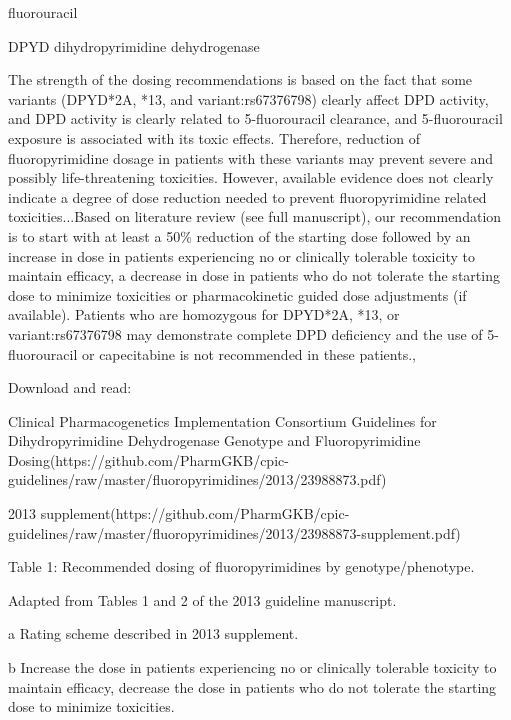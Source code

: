 \documentclass{resume} %
\begin{document}
\begin{rSection}{ fluorouracil }
\begin{rSubsection}{ DPYD }{ dihydropyrimidine dehydrogenase }{}{}
\item The strength of the dosing recommendations is based on the fact that some variants (DPYD*2A, *13, and variant:rs67376798) clearly affect DPD activity, and DPD activity is clearly related to 5-fluorouracil clearance, and 5-fluorouracil exposure is associated with its toxic effects. Therefore, reduction of fluoropyrimidine dosage in patients with these variants may prevent severe and possibly life-threatening toxicities. However, available evidence does not clearly indicate a degree of dose reduction needed to prevent fluoropyrimidine related toxicities...Based on literature review (see full manuscript), our recommendation is to start with at least a 50\% reduction of the starting dose followed by an increase in dose in patients experiencing no or clinically tolerable toxicity to maintain efficacy, a decrease in dose in patients who do not tolerate the starting dose to minimize toxicities or pharmacokinetic guided dose adjustments (if available). Patients who are homozygous for DPYD*2A, *13, or variant:rs67376798 may demonstrate complete DPD deficiency and the use of 5-fluorouracil or capecitabine is not recommended in these patients.,  
 \newline
\item Download and read:
 \newline
\item Clinical Pharmacogenetics Implementation Consortium Guidelines for Dihydropyrimidine Dehydrogenase Genotype and Fluoropyrimidine Dosing(https://github.com/PharmGKB/cpic-guidelines/raw/master/fluoropyrimidines/2013/23988873.pdf)
 \newline
\item 2013 supplement(https://github.com/PharmGKB/cpic-guidelines/raw/master/fluoropyrimidines/2013/23988873-supplement.pdf)
 \newline
\item Table 1: Recommended dosing of fluoropyrimidines by genotype/phenotype.
 \newline
\item Adapted from Tables 1 and 2 of the 2013 guideline manuscript.
 \newline
\item a Rating scheme described in 2013 supplement.
 \newline
\item b Increase the dose in patients experiencing no or clinically tolerable toxicity to maintain efficacy,  decrease the dose in patients who do not tolerate the starting dose to minimize toxicities.

\end{rSubsection}
\end{rSection}
\end{document}
